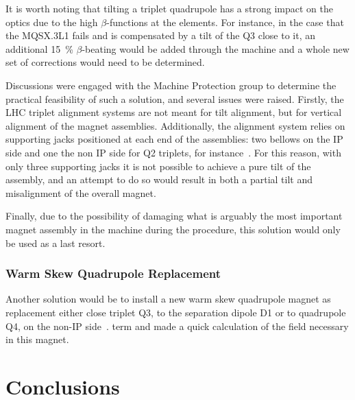 It is worth noting that tilting a triplet quadrupole has a strong impact on the optics due to the high \(\beta\)-functions at the elements.
For instance, in the case that the MQSX.\num{3}L\num{1} fails and is compensated by a tilt of the Q\num{3} close to it, an additional \qty{15}{\percent} \(\beta\)-beating would be added through the machine and a whole new set of corrections would need to be determined.

Discussions were engaged with the Machine Protection group to determine the practical feasibility of such a solution, and several issues were raised.
Firstly, the LHC triplet alignment systems are not meant for tilt alignment, but for vertical alignment of the magnet assemblies.
Additionally, the alignment system relies on supporting jacks positioned at each end of the assemblies: two bellows on the IP side and one the non IP side for Q2 triplets, for instance~\cite{IPAC:Micolon:LHC_Triplet_Magnet_Supporting_System, IWAA:Durand:Remote_Positioning_LHC_Inner_Triplet}.
For this reason, with only three supporting jacks it is not possible to achieve a pure tilt of the assembly, and an attempt to do so would result in both a partial tilt and misalignment of the overall magnet.

Finally, due to the possibility of damaging what is arguably the most important magnet assembly in the machine during the procedure, this solution would only be used as a last resort.

\subsubsection*{Warm Skew Quadrupole Replacement}

Another solution would be to install a new warm skew quadrupole magnet as replacement either close triplet Q\num{3}, to the separation dipole D\num{1} or to quadrupole Q\num{4}, on the non-IP side~\cite{PRES:Persson:Integrated_Lumi_MQSX_Carryovers}.
 term and made a quick calculation of the field necessary in this magnet.





\section{Conclusions}


